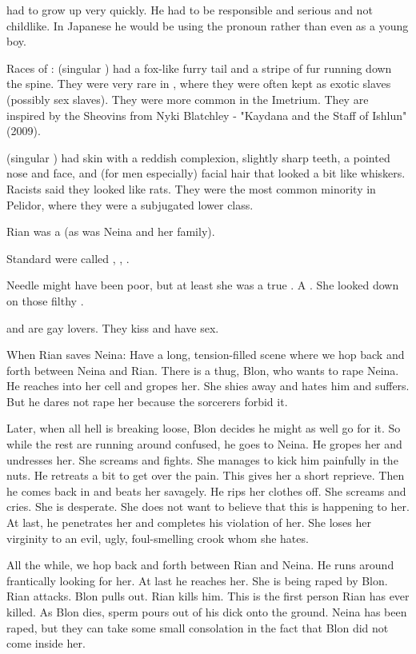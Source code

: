 \Thanatzil had to grow up very quickly. 
He had to be responsible and serious and not childlike.
In Japanese he would be using the pronoun  rather than  even as a young boy. 

Races of \demihumans:
  \Sheomir (singular \sheomir) had a fox-like furry tail and a stripe of fur running down the spine. 
  They were very rare in \Velcad, where they were often kept as exotic slaves (possibly sex slaves). 
  They were more common in the Imetrium.
  They are inspired by the Sheovins from Nyki Blatchley - "Kaydana and the Staff of Ishlun" (2009). 

  \Tulans (singular \tulan) had skin with a reddish complexion, slightly sharp teeth, a pointed nose and face, and (for men especially) facial hair that looked a bit like whiskers. 
  Racists said they looked like rats. 
  They were the most common minority in Pelidor, where they were a subjugated lower class. 
  
  Rian was a \tulan (as was Neina and her family).
  
  Standard \humans were called \highhumans, \highmen, \highwomen.
  
  Needle might have been poor, but at least she was a true \human. 
  A \highwoman. 
  She looked down on those filthy \demihumans.

\Teshrial and \Menessiaraid are gay lovers. 
They kiss and have sex. 

When Rian saves Neina: 
  Have a long, tension-filled scene where we hop back and forth between Neina and Rian. 
  There is a thug, Blon, who wants to rape Neina.
  He reaches into her cell and gropes her. 
  She shies away and hates him and suffers. 
  But he dares not rape her because the sorcerers forbid it. 
  
  Later, when all hell is breaking loose, Blon decides he might as well go for it. 
  So while the rest are running around confused, he goes to Neina. 
  He gropes her and undresses her. 
  She screams and fights.
  She manages to kick him painfully in the nuts.
  He retreats a bit to get over the pain. 
  This gives her a short reprieve.
  Then he comes back in and beats her savagely. 
  He rips her clothes off.
  She screams and cries. 
  She is desperate. 
  She does not want to believe that this is happening to her. 
  At last, he penetrates her and completes his violation of her. 
  She loses her virginity to an evil, ugly, foul-smelling crook whom she hates. 
  
  All the while, we hop back and forth between Rian and Neina.
  He runs around frantically looking for her. 
  At last he reaches her.
  She is being raped by Blon. 
  Rian attacks.
  Blon pulls out.
  Rian kills him.
  This is the first person Rian has ever killed. 
  As Blon dies, sperm pours out of his dick onto the ground.
  Neina has been raped, but they can take some small consolation in the fact that Blon did not come inside her. 
  
